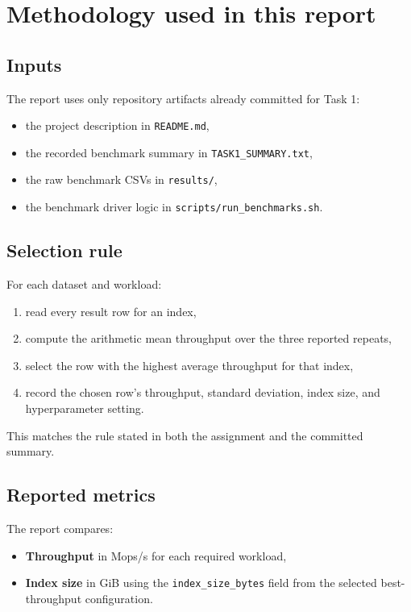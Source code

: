 \documentclass[11pt]{article}
\begin{document}
\section{Methodology used in this report}

\subsection{Inputs}
The report uses only repository artifacts already committed for Task 1:
\begin{itemize}[leftmargin=1.5em]
    \item the project description in \texttt{README.md},
    \item the recorded benchmark summary in \texttt{TASK1\_SUMMARY.txt},
    \item the raw benchmark CSVs in \texttt{results/},
    \item the benchmark driver logic in \texttt{scripts/run\_benchmarks.sh}.
\end{itemize}

\subsection{Selection rule}
For each dataset and workload:
\begin{enumerate}[leftmargin=1.5em]
    \item read every result row for an index,
    \item compute the arithmetic mean throughput over the three reported repeats,
    \item select the row with the highest average throughput for that index,
    \item record the chosen row's throughput, standard deviation, index size, and
    hyperparameter setting.
\end{enumerate}

This matches the rule stated in both the assignment and the committed summary.

\subsection{Reported metrics}
The report compares:
\begin{itemize}[leftmargin=1.5em]
    \item \textbf{Throughput} in Mops/s for each required workload,
    \item \textbf{Index size} in GiB using the \texttt{index\_size\_bytes} field from the
    selected best-throughput configuration.
\end{itemize}
\end{document}
